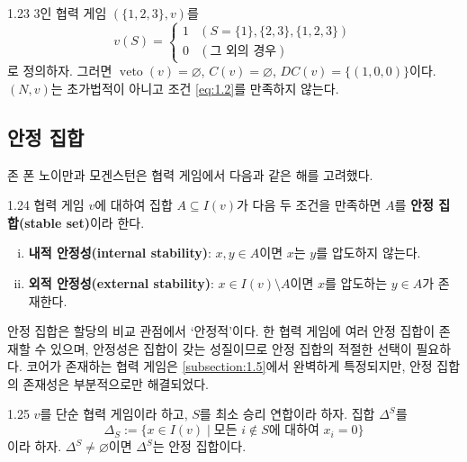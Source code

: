 \documentclass{article}
\numberwithin{equation}{section}
\begin{document}
\begin{example}{}{1.23}
	$3$인 협력 게임 $(\{1,2,3\},v)$를
	\[
		v(S)=\begin{cases}
			1 & (S=\{1\},\{2,3\},\{1,2,3\})\\
			0 & (\text{그 외의 경우})
		\end{cases}
	\]
	로 정의하자. 그러면 $\operatorname{veto}(v)=\varnothing$, $C(v)=\varnothing$, $DC(v)=\{(1,0,0)\}$이다. $(N,v)$는 초가법적이 아니고 조건 \ref{eq:1.2}를 만족하지 않는다.
\end{example}

\newpage
\subsection{안정 집합}
존 폰 노이만과 모겐스턴은 협력 게임에서 다음과 같은 해를 고려했다.

\begin{dfn}{}{1.24}
	협력 게임 $v$에 대하여 집합 $A\subseteq I(v)$가 다음 두 조건을 만족하면 $A$를 \textbf{안정 집합(stable set)}이라 한다.
	\begin{enumerate}[(i)]
		\item \textbf{내적 안정성(internal stability)}: $x,y\in A$이면 $x$는 $y$를 압도하지 않는다.
		\item \textbf{외적 안정성(external stability)}: $x\in I(v)\setminus A$이면 $x$를 압도하는 $y\in A$가 존재한다.
	\end{enumerate}
\end{dfn}

\noindent 안정 집합은 할당의 비교 관점에서 `안정적'이다. 한 협력 게임에 여러 안정 집합이 존재할 수 있으며, 안정성은 집합이 갖는 성질이므로 안정 집합의 적절한 선택이 필요하다. 코어가 존재하는 협력 게임은 \ref{subsection:1.5}에서 완벽하게 특정되지만, 안정 집합의 존재성은 부분적으로만 해결되었다.

\begin{thm}{}{1.25}
	$v$를 단순 협력 게임이라 하고, $S$를 최소 승리 연합이라 하자. 집합 $\Delta^S$를
	\[
		\Delta_S:=\{x\in I(v)\mid\text{모든 }i\notin S\text{에 대하여 }x_i=0\}
	\]
	이라 하자. $\Delta^S\ne\varnothing$이면 $\Delta^S$는 안정 집합이다.
\end{thm}
\end{document}
